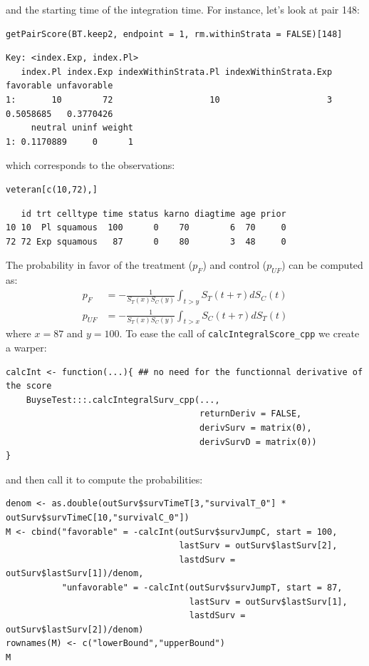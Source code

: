 \documentclass[12pt]{article}
\begin{document}
and the starting time of the integration time. For instance, let's
look at pair 148:
\lstset{language=r,label= ,caption= ,captionpos=b,numbers=none}
\begin{lstlisting}
getPairScore(BT.keep2, endpoint = 1, rm.withinStrata = FALSE)[148]
\end{lstlisting}

\begin{verbatim}
Key: <index.Exp, index.Pl>
   index.Pl index.Exp indexWithinStrata.Pl indexWithinStrata.Exp favorable unfavorable
1:       10        72                   10                     3 0.5058685   0.3770426
     neutral uninf weight
1: 0.1170889     0      1
\end{verbatim}


which corresponds to the observations:
\lstset{language=r,label= ,caption= ,captionpos=b,numbers=none}
\begin{lstlisting}
veteran[c(10,72),]
\end{lstlisting}

\begin{verbatim}
   id trt celltype time status karno diagtime age prior
10 10  Pl squamous  100      0    70        6  70     0
72 72 Exp squamous   87      0    80        3  48     0
\end{verbatim}


The probability in favor of the treatment (\(p_F\)) and control (\(p_{UF}\)) can be computed
as:
\begin{align*}
p_F &= -\frac{1}{S_T(x)S_C(y)}\int_{t>y} S_T(t+\tau) dS_C(t) \\
p_{UF} &= -\frac{1}{S_T(x)S_C(y)}\int_{t>x} S_C(t+\tau) dS_T(t)
\end{align*}
where \(x=87\) and \(y=100\). To ease the call of \texttt{calcIntegralScore\_cpp} we create a warper:
\lstset{language=r,label= ,caption= ,captionpos=b,numbers=none}
\begin{lstlisting}
calcInt <- function(...){ ## no need for the functionnal derivative of the score 
    BuyseTest:::.calcIntegralSurv_cpp(..., 
                                      returnDeriv = FALSE, 
                                      derivSurv = matrix(0), 
                                      derivSurvD = matrix(0))
}
\end{lstlisting}

\clearpage

and then call it to compute the probabilities:
\lstset{language=r,label= ,caption= ,captionpos=b,numbers=none}
\begin{lstlisting}
denom <- as.double(outSurv$survTimeT[3,"survivalT_0"] * outSurv$survTimeC[10,"survivalC_0"])
M <- cbind("favorable" = -calcInt(outSurv$survJumpC, start = 100, 
                                  lastSurv = outSurv$lastSurv[2],
                                  lastdSurv = outSurv$lastSurv[1])/denom,
           "unfavorable" = -calcInt(outSurv$survJumpT, start = 87, 
                                    lastSurv = outSurv$lastSurv[1],
                                    lastdSurv = outSurv$lastSurv[2])/denom)
rownames(M) <- c("lowerBound","upperBound")
M
\end{lstlisting}
\end{document}

